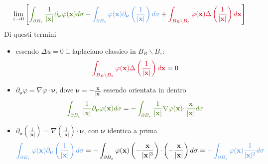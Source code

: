 \documentclass[10pt,a4paper,twoside,openright]{book}
\newcommand{\x}{\mathbf{x}}
\begin{document}
\begin{equation}
	\lim _{\varepsilon \rightarrow 0}\left[\textcolor[rgb]{0.25,0.46,0.02}{\int _{\partial B_{\varepsilon }}\frac{1}{| \x| } \partial _{\bm{\nu}} \varphi (\x) d\sigma } -\textcolor[rgb]{0.29,0.56,0.89}{\int _{\partial B_{\varepsilon }} \varphi (\x) \partial _{\bm{\nu}}\left(\frac{1}{| \x| }\right) d\sigma } +\textcolor[rgb]{0.82,0.01,0.11}{\int _{B_{R} \backslash B_{\varepsilon }} \varphi (\x) \Delta \left(\frac{1}{| \x| }\right) d\x}\right]
	\label{eq:esempio-derivata-limite-2}
\end{equation}
Di questi termini
\begin{itemize}
	\item essendo $\displaystyle \Delta u=0$ il laplaciano classico in $\displaystyle B_{R} \backslash B_{\varepsilon }$:\begin{equation*}
	      \textcolor[rgb]{0.82,0.01,0.11}{\int _{B_{R} \backslash B_{\varepsilon }} \varphi (\x) \Delta \left(\frac{1}{| \x| }\right) d\x} =0
	\end{equation*}
	\item  $\displaystyle \partial _{\bm{\nu}} \varphi =\nabla \varphi \cdotp \bm{\nu}$, dove $\displaystyle \bm{\nu} =-\frac{\x}{| \x| }$ essendo orientata in dentro\begin{equation*}
	      \textcolor[rgb]{0.25,0.46,0.02}{\int _{\partial B_{\varepsilon }}\frac{1}{| \x| } \partial _{\bm{\nu}} \varphi (\x) d\sigma } =\textcolor[rgb]{0.25,0.46,0.02}{-\int _{\partial B_{\varepsilon }}\frac{1}{| \x| } \nabla \varphi (\x) \cdotp \frac{\x}{| \x| } d\sigma }
	\end{equation*}
	\item $\displaystyle \partial _{\bm{\nu}}\left(\frac{1}{| \x| }\right) =\nabla \left(\frac{1}{| \x| }\right) \cdotp \bm{\nu}$, con $\displaystyle \bm{\nu}$ identica a prima\begin{equation*}
	      \textcolor[rgb]{0.29,0.56,0.89}{\int _{\partial B_{\varepsilon }} \varphi (\x) \partial_{\bm{\nu}}\left(\frac{1}{| \x| }\right) d\sigma } =-\int _{\partial B_{\varepsilon }} \varphi (\x)\left( -\frac{\x}{| \x| ^{3}}\right) \cdotp \left( -\frac{\x}{| \x| }\right) d\sigma =\textcolor[rgb]{0.29,0.56,0.89}{-\int _{\partial B_{\varepsilon }} \varphi (\x)\frac{1}{| \x| ^{2}} d\sigma }
	\end{equation*}
\end{itemize}
\end{document}
